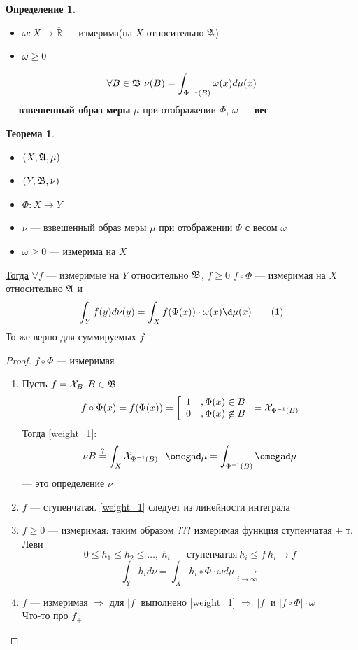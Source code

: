 \documentclass[russ,oneside]{book}
\newcommand\addtag{\refstepcounter{equation}\tag{\theequation}}
\newcommand{\R}{\mathbb{R}}
\theoremstyle{plain}
\theoremstyle{remark}
\theoremstyle{definition}
\newtheorem{theorem}{Теорема}[section]
\newtheorem*{definition}{Определение}
\begin{document}
\begin{definition}
\-
\begin{itemize}
\item \(\omega: X\to\overline{\R}\) --- измерима(на \(X\) относительно \(\mathfrak{A}\))
\item \(\omega \ge 0\)
\end{itemize}
\[ \forall B \in \mathfrak{B}\ \nu(B) = \int_{\Phi^{-1}(B)}\omega(x)d\mu(x) \]
--- \textbf{взвешенный образ меры} \(\mu\) при отображении \(\Phi\), \(\omega\) --- \textbf{вес}
\end{definition}
\begin{theorem}
\-
\begin{itemize}
\item \((X, \mathfrak{A}, \mu)\)
\item \((Y, \mathfrak{B}, \nu)\)
\item \(\Phi: X \to Y\)
\item \(\nu\) --- взвешенный образ меры \(\mu\) при отображении \(\Phi\) с весом \(\omega\)
\item \(\omega \ge 0\) --- измерима на \(X\)
\end{itemize}
\uline{Тогда} \(\forall f\) --- измеримые на \(Y\) относительно \(\mathfrak{B}\), \(f \ge 0\) \(f\circ \Phi\) --- измеримая на \(X\) относительно \(\mathfrak{A}\) и
\[ \int_Y f(y) d\nu(y) = \int_X f(\Phi(x))\cdot\omega(x)\d\mu(x) \label{weight_1}\addtag \]
То же верно для суммируемых \(f\)
\end{theorem}
\begin{proof}
\(f\circ \Phi\) --- измеримая \\
\begin{enumerate}
\item Пусть \(f = \mathcal{X}_B, B \in \mathfrak{B}\)
\[ f\circ \Phi(x) = f(\Phi(x)) = \left[\begin{array}{ll} 1 & ,\Phi(x) \in B \\ 0 & ,\Phi(x) \not\in B\end{array}\right. =\mathcal{X}_{\Phi^{-1}(B)} \]
Тогда \ref{weight_1}:
\[ \nu B \overset{?}{=} \int_X \X_{\Phi^{-1}(B)}\cdot\omegad\mu = \int_{\Phi^{-1}(B)}\omegad\mu  \]
--- это определение \(\nu\)
\item \(f\) --- ступенчатая. \ref{weight_1} следует из линейности интеграла
\item \(f \ge 0\) --- измеримая: таким образом ??? измеримая функция ступенчатая + т. Леви
\[ 0 \le h_1 \le h_2 \le \dots,\ h_i\text{ --- ступенчатая}\ h_i \le f\ h_i \to f \]
\[ \int_Y h_i d\nu = \int_X h_i \circ \Phi\cdot\omega d\mu \xrightarrow[i \to \infty]{} \]
\item \(f\) --- измеримая \(\Rightarrow\) для \(|f|\) выполнено \ref{weight_1} \(\Rightarrow\) \(|f|\) и \(|f\circ \Phi|\cdot \omega\) \\
\color{red}Что-то про \(f_+\) \color{black}
\end{enumerate}
\end{proof}
\end{document}
